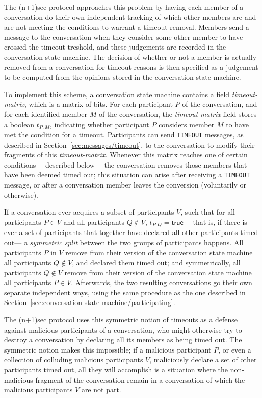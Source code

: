 \documentclass{article}
\def\message#1{\texttt{#1}}
\def\smfield#1{\textsl{#1}}
\def\type#1{\textsf{#1}}
\begin{document}
The (n+1)sec protocol approaches this problem by having each member of a conversation do their own independent tracking of which other members are and are not meeting the conditions to warrant a timeout removal.
Members send a message to the conversation when they consider some other member to have crossed the timeout treshold, and these judgements are recorded in the conversation state machine.
The decision of whether or not a member is actually removed from a conversation for timeout reasons is then specified as a judgement to be computed from the opinions stored in the conversation state machine.


To implement this scheme, a conversation state machine contains a field \smfield{timeout-matrix}, which is a matrix of bits.
For each participant $P$ of the conversation, and for each identified member $M$ of the conversation, the \smfield{timeout-matrix} field stores a \type{boolean} $t_{P,M}$, indicating whether participant $P$ considers member $M$ to have met the condition for a timeout.
Participants can send \message{TIMEOUT} messages, as described in Section~\ref{sec:messages/timeout}, to the conversation to modify their fragments of this \smfield{timeout-matrix}.
Whenever this matrix reaches one of certain conditions ---described below--- the conversation removes those members that have been deemed timed out; this situation can arise after receiving a \message{TIMEOUT} message, or after a conversation member leaves the conversion (voluntarily or otherwise).

If a conversation ever acquires a subset of participants $V$, such that for all participants $P \in V$ and all participants $Q \not\in V$, $t_{P,Q} = \textsf{true}$ ---that is, if there is ever a set of participants that together have declared all other participants timed out--- a \emph{symmetric split} between the two groups of participants happens.
All participants $P$ in $V$ remove from their version of the conversation state machine all participants $Q \not\in V$, and declared them timed out; and symmetrically, all participants $Q \not\in V$ remove from their version of the conversation state machine all participants $P \in V$.
Afterwards, the two resulting conversations go their own separate independent ways, using the same procedure as the one described in Section~\ref{sec:conversation-state-machine/participating}.

The (n+1)sec protocol uses this symmetric notion of timeouts as a defense against malicious participants of a conversation, who might otherwise try to destroy a conversation by declaring all its members as being timed out.
The symmetric notion makes this impossible; if a malicious participant $P$, or even a collection of colluding malicious participants $V$, maliciously declare a set of other participants timed out, all they will accomplish is a situation where the non-malicious fragment of the conversation remain in a conversation of which the malicious participants $V$ are not part.
\end{document}
